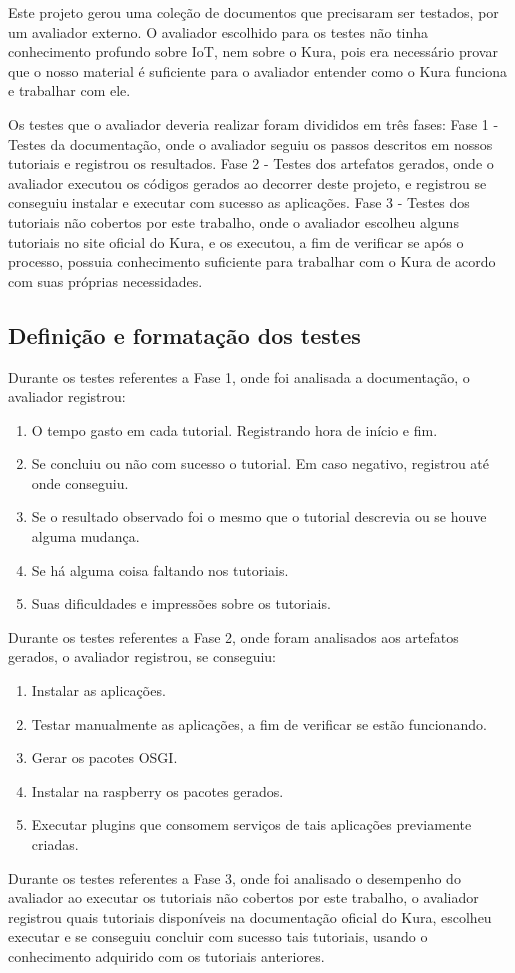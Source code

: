 Este projeto gerou uma coleção de documentos que precisaram ser testados, por um avaliador externo. O avaliador escolhido para os testes não tinha conhecimento profundo sobre IoT, nem sobre o Kura, pois era necessário provar que o nosso material é suficiente para o avaliador entender como o Kura funciona e trabalhar com ele.

Os testes que o avaliador deveria realizar foram divididos em três fases: Fase 1 - Testes da documentação, onde o avaliador seguiu os passos descritos em nossos tutoriais e registrou os resultados. Fase 2 - Testes dos artefatos gerados, onde o avaliador executou os códigos gerados ao decorrer deste projeto, e registrou se conseguiu instalar e executar com sucesso as aplicações. Fase 3 - Testes dos tutoriais não cobertos por este trabalho, onde o avaliador escolheu alguns tutoriais no site oficial do Kura, e os executou, a fim de verificar se após o processo, possuia conhecimento suficiente para trabalhar com o Kura de acordo com suas próprias necessidades.

\subsection{Definição e formatação dos testes}

Durante os testes referentes a Fase 1, onde foi analisada a documentação, o avaliador registrou:

\begin{enumerate}
  \item O tempo gasto em cada tutorial. Registrando hora de início e fim.
  \item Se concluiu ou não com sucesso o tutorial. Em caso negativo, registrou até onde conseguiu.
  \item Se o resultado observado foi o mesmo que o tutorial descrevia ou se houve alguma mudança.
  \item Se há alguma coisa faltando nos tutoriais.
  \item Suas dificuldades e impressões sobre os tutoriais.
\end{enumerate}
Durante os testes referentes a Fase 2, onde foram analisados aos artefatos gerados, o avaliador registrou, se conseguiu:

\begin{enumerate}
  \item Instalar as aplicações.
  \item Testar manualmente as aplicações, a fim de verificar se estão funcionando.
  \item Gerar os pacotes OSGI.
  \item Instalar na raspberry os pacotes gerados.
  \item Executar plugins que consomem serviços de tais aplicações previamente criadas.
\end{enumerate}
Durante os testes referentes a Fase 3, onde foi analisado o desempenho do avaliador ao executar os tutoriais não cobertos por este trabalho, o avaliador registrou quais tutoriais disponíveis na documentação oficial do Kura, escolheu executar e se conseguiu concluir com sucesso tais tutoriais, usando o conhecimento adquirido com os tutoriais anteriores.





